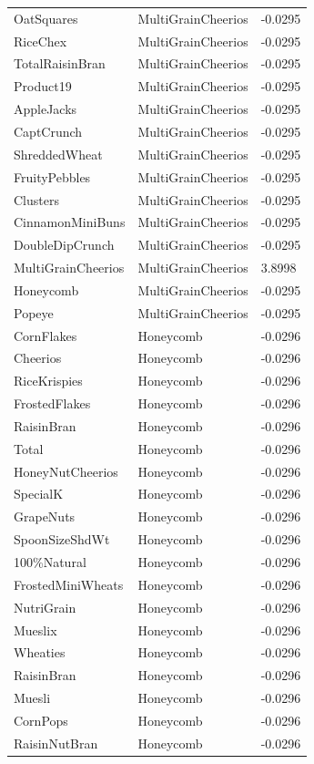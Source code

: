 \begin{table}[!htbp]
\begin{tabular}{lll}
OatSquares & MultiGrainCheerios & -0.0295
\\
RiceChex & MultiGrainCheerios & -0.0295
\\
TotalRaisinBran & MultiGrainCheerios & -0.0295
\\
Product19 & MultiGrainCheerios & -0.0295
\\
AppleJacks & MultiGrainCheerios & -0.0295
\\
CaptCrunch & MultiGrainCheerios & -0.0295
\\
ShreddedWheat & MultiGrainCheerios & -0.0295
\\
FruityPebbles & MultiGrainCheerios & -0.0295
\\
Clusters & MultiGrainCheerios & -0.0295
\\
CinnamonMiniBuns & MultiGrainCheerios & -0.0295
\\
DoubleDipCrunch & MultiGrainCheerios & -0.0295
\\
MultiGrainCheerios & MultiGrainCheerios & 3.8998
\\
Honeycomb & MultiGrainCheerios & -0.0295
\\
Popeye & MultiGrainCheerios & -0.0295
\\
CornFlakes & Honeycomb & -0.0296
\\
Cheerios & Honeycomb & -0.0296
\\
RiceKrispies & Honeycomb & -0.0296
\\
FrostedFlakes & Honeycomb & -0.0296
\\
RaisinBran & Honeycomb & -0.0296
\\
Total & Honeycomb & -0.0296
\\
HoneyNutCheerios & Honeycomb & -0.0296
\\
SpecialK & Honeycomb & -0.0296
\\
GrapeNuts & Honeycomb & -0.0296
\\
SpoonSizeShdWt & Honeycomb & -0.0296
\\
100\%Natural & Honeycomb & -0.0296
\\
FrostedMiniWheats & Honeycomb & -0.0296
\\
NutriGrain & Honeycomb & -0.0296
\\
Mueslix & Honeycomb & -0.0296
\\
Wheaties & Honeycomb & -0.0296
\\
RaisinBran & Honeycomb & -0.0296
\\
Muesli & Honeycomb & -0.0296
\\
CornPops & Honeycomb & -0.0296
\\
RaisinNutBran & Honeycomb & -0.0296

\end{tabular}
\end{table}
